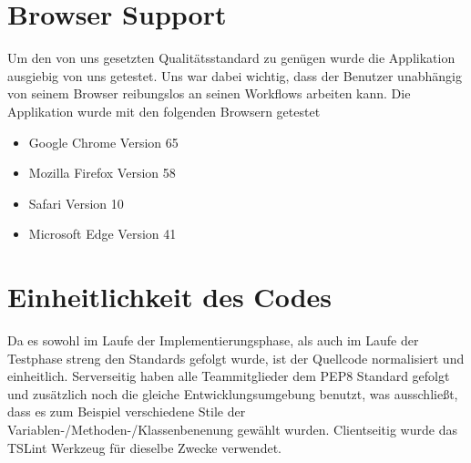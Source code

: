 \chapter{Browser Support}

Um den von uns gesetzten Qualitätsstandard zu genügen wurde die Applikation ausgiebig von uns getestet.
Uns war dabei wichtig, dass der Benutzer unabhängig von seinem Browser reibungslos an seinen Workflows arbeiten kann.
\newline
\newline
Die Applikation wurde mit den folgenden Browsern getestet
\begin{itemize}
  \item Google Chrome Version 65
  \item Mozilla Firefox Version 58
  \item Safari Version 10
  \item Microsoft Edge Version 41
\end{itemize}


\chapter{Einheitlichkeit des Codes}
Da es sowohl im Laufe der Implementierungsphase, als auch im Laufe der Testphase streng den Standards gefolgt wurde, ist der Quellcode normalisiert und einheitlich. Serverseitig haben alle Teammitglieder dem \gls{PEP}8 Standard gefolgt und zusätzlich noch die gleiche Entwicklungsumgebung benutzt, was ausschließt, dass es zum Beispiel verschiedene Stile der Variablen-/Methoden-/Klassenbenenung gewählt wurden. Clientseitig wurde das TSLint Werkzeug für dieselbe Zwecke verwendet.